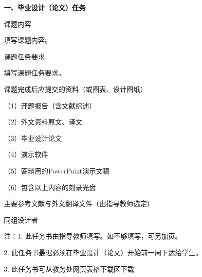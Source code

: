 \documentclass{csustThesis}
\begin{document}
\makeTaskBookCover

\pagestyle{empty}  %

{\noindent{}\bfseries 一、毕业设计（论文）任务}

\begin{ubox}[breakable,]
\noindent 课题内容

填写课题内容。

\vspace*{13\baselineskip}


\end{ubox}

\vspace{-\baselineskip}

\begin{ubox}
\noindent 课题任务要求

填写课题任务要求。

\end{ubox}

\vspace{-\baselineskip}

\begin{ubox}[breakable,]
\noindent   课题完成后应提交的资料（或图表、设计图纸）

（1）开题报告（含文献综述）

（2）外文资料原文、译文

（3）毕业设计论文

（4）演示软件

（5）答辩用的PowerPoint演示文稿

（6）包含以上内容的刻录光盘

\vspace*{3\baselineskip}
\end{ubox}

\vspace{-\baselineskip}

\begin{ubox}[breakable,]
\noindent 主要参考文献与外文翻译文件（由指导教师选定）

\vspace*{15\baselineskip}
\end{ubox}

\vspace{-\baselineskip}

\begin{ubox}
\noindent 同组设计者

\vspace*{\baselineskip}
\end{ubox}

\noindent 注：1. 此任务书由指导教师填写。如不够填写，可另加页。

2. 此任务书最迟必须在毕业设计（论文）开始前一周下达给学生。

3. 此任务书可从教务处网页表格下载区下载
\end{document}
